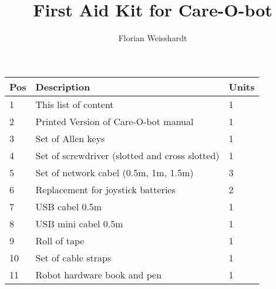 \documentclass{article}
\title{First Aid Kit for Care-O-bot} %
\author{Florian Weisshardt} %
\begin{document}
\maketitle %

\begin{tabular}{|l|l|l|}
\hline
\textbf{Pos} & \textbf{Description} & \textbf{Units}\\
\hline\hline
1 & This list of content & 1\\
2 & Printed Version of Care-O-bot manual & 1\\
3 & Set of Allen keys & 1\\
4 & Set of screwdriver (slotted and cross slotted) & 1\\
5 & Set of network cabel (0.5m, 1m, 1.5m) & 3\\
6 & Replacement for joystick batteries & 2\\
7 & USB cabel 0.5m & 1\\
8 & USB mini cabel 0.5m & 1\\
9 & Roll of tape & 1\\
10 & Set of cable straps & 1\\
11 & Robot hardware book and pen & 1\\
\hline
\end{tabular}
\end{document}
